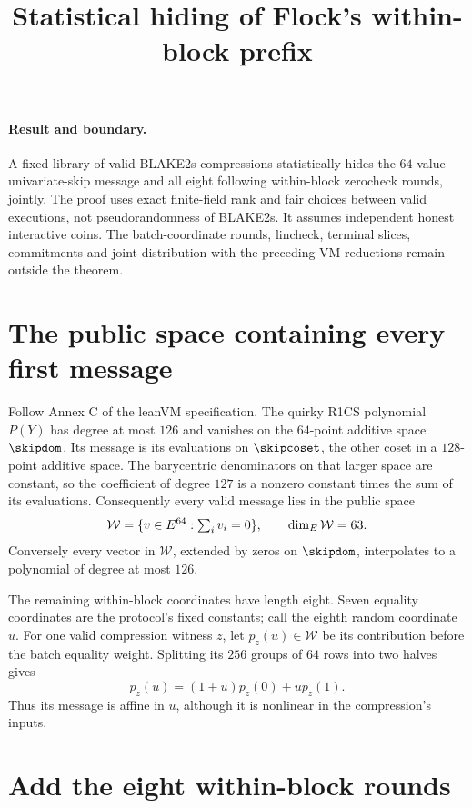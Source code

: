 \documentclass[11pt]{article}
\title{Statistical hiding of Flock's within-block prefix}
\author{}
\date{}
\begin{document}
\maketitle
\vspace{-2em}

\paragraph{Result and boundary.} A fixed library of valid BLAKE2s compressions statistically hides the $64$-value univariate-skip message and all eight following within-block zerocheck rounds, jointly. The proof uses exact finite-field rank and fair choices between valid executions, not pseudorandomness of BLAKE2s. It assumes independent honest interactive coins. The batch-coordinate rounds, lincheck, terminal slices, commitments and joint distribution with the preceding VM reductions remain outside the theorem.

\section{The public space containing every first message}

Follow Annex C of the leanVM specification. The quirky R1CS polynomial $P(Y)$ has degree at most $126$ and vanishes on the $64$-point additive space $\skipdom$. Its message is its evaluations on $\skipcoset$, the other coset in a $128$-point additive space. The barycentric denominators on that larger space are constant, so the coefficient of degree $127$ is a nonzero constant times the sum of its evaluations. Consequently every valid message lies in the public space
\[
 \mathcal W=\{v\in E^{64}:\textstyle\sum_i v_i=0\},
 \qquad \dim_{E}\mathcal W=63.
\]
Conversely every vector in $\mathcal W$, extended by zeros on $\skipdom$, interpolates to a polynomial of degree at most $126$.

The remaining within-block coordinates have length eight. Seven equality coordinates are the protocol's fixed constants; call the eighth random coordinate $u$. For one valid compression witness $z$, let $p_z(u)\in\mathcal W$ be its contribution before the batch equality weight. Splitting its $256$ groups of $64$ rows into two halves gives
\[
 p_z(u)=(1+u)p_z(0)+u p_z(1).
\]
Thus its message is affine in $u$, although it is nonlinear in the compression's inputs.

\section{Add the eight within-block rounds}
\end{document}
